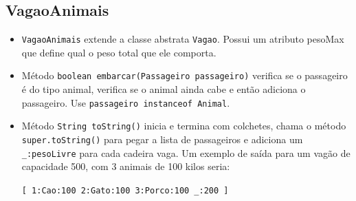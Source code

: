 \documentclass[12pt]{article}
\renewcommand{\tt}[1]{\lstinline|#1|}
\begin{document}
\subsection{VagaoAnimais}
\begin{itemize}
\item \tt{VagaoAnimais} extende a classe abstrata \tt{Vagao}. Possui um atributo pesoMax que define qual o peso total que ele comporta. 
\item Método \tt{boolean embarcar(Passageiro passageiro)} verifica se o passageiro é do tipo animal, verifica se o animal ainda cabe e então adiciona o passageiro. Use \tt{passageiro instanceof Animal}.
\item Método \tt{String toString()} inicia e termina com colchetes, chama o método \tt{super.toString()} para
pegar a lista de passageiros e adiciona um \tt{_:pesoLivre} para cada cadeira vaga. Um exemplo de saída para um vagão de capacidade 500, com 3 animais de 100 kilos seria:

\verb|[ 1:Cao:100 2:Gato:100 3:Porco:100 _:200 ]|
\end{itemize}
\end{document}
